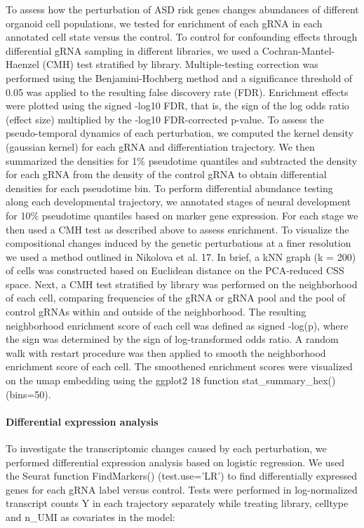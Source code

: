To assess how the perturbation of ASD risk genes changes abundances of different organoid cell populations, we tested for enrichment of each gRNA in each annotated cell state versus the control. To control for confounding effects through differential gRNA sampling in different libraries, we used a Cochran-Mantel-Haenzel (CMH) test stratified by library. Multiple-testing correction was performed using the Benjamini-Hochberg method and a significance threshold of 0.05 was applied to the resulting false discovery rate (FDR). Enrichment effects were plotted using the signed -log10 FDR, that is, the sign of the log odds ratio (effect size) multiplied by the -log10 FDR-corrected p-value. To assess the pseudo-temporal dynamics of each perturbation, we computed the kernel density (gaussian kernel) for each gRNA and differentiation trajectory. We then summarized the densities for 1\% pseudotime quantiles and subtracted the density for each gRNA from the density of the control gRNA to obtain differential densities for each pseudotime bin. To perform differential abundance testing along each developmental trajectory, we annotated stages of neural development for 10\% pseudotime quantiles based on marker gene expression. For each stage we then used a CMH test as described above to assess enrichment. To visualize the compositional changes induced by the genetic perturbations at a finer resolution we used a method outlined in Nikolova et al. 17. In brief, a kNN graph (k = 200) of cells was constructed based on Euclidean distance on the PCA-reduced CSS space. Next, a CMH test stratified by library was performed on the neighborhood of each cell, comparing frequencies of the gRNA or gRNA pool and the pool of control gRNAs within and outside of the neighborhood. The resulting neighborhood enrichment score of each cell was defined as signed -log(p), where the sign was determined by the sign of log-transformed odds ratio. A random walk with restart procedure was then applied to smooth the neighborhood enrichment score of each cell. The smoothened enrichment scores were visualized on the umap embedding using the ggplot2 18 function stat\_summary\_hex() (bins=50).

\paragraph{Differential expression analysis}
To investigate the transcriptomic changes caused by each perturbation, we performed differential expression analysis based on logistic regression. We used the Seurat function FindMarkers() (test.use='LR') to find differentially expressed genes for each gRNA label versus control. Tests were performed in log-normalized transcript counts Y in each trajectory separately while treating library, celltype and n\_UMI as covariates in the model:

